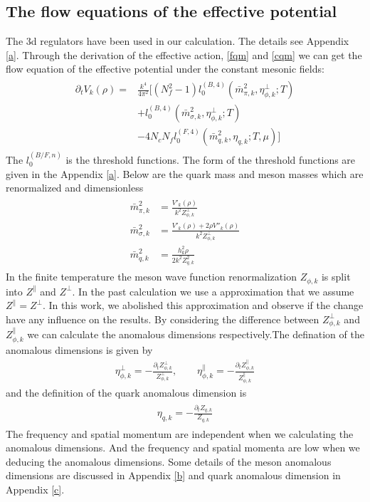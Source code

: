 \documentclass[%
reprint,
superscriptaddress,
showpacs,preprintnumbers,
 amsmath,amssymb,
 aps,
prd,
]{revtex4-1}
\begin{document}
\subsection{The flow equations of the effective potential}
The 3d regulators have been used in our calculation. The details see Appendix \ref{a}. Through the derivation of the 
effective action, \ref{fqm} and \ref{cqm} we can get the flow equation of the effective potential under the constant mesonic
fields:
\begin{align}
\begin{split}
\partial_tV_k(\rho)=&\frac{k^4}{4\pi^2}[(N^2_f-1)l^{(B,4)}_{0}(\bar{m}^{2}_{\pi,k},\eta^{\bot}_{\phi,k};T)\\
&+l^{(B,4)}_{0}(\bar{m}^{2}_{\sigma,k},\eta^{\bot}_{\phi,k};T)\\
&-4N_cN_fl^{(F,4)}_{0}(\bar{m}^{2}_{q,k},\eta_{q,k};T,\mu)]
\end{split}
\end{align}
The $l_0^{(B/F,n)}$ is the threshold functions. The form of the threshold functions are given in the Appendix \ref{a}. Below 
are the quark mass and meson masses which are renormalized and dimensionless
\begin{align}
\begin{split}
\bar{m}^{2}_{\pi,k}&=\frac{V'_k(\rho)}{k^2Z^{\bot}_{\phi,k}}\\
\bar{m}^{2}_{\sigma,k}&=\frac{V'_k(\rho)+2\rho V''_k(\rho)}{k^2Z^{\bot}_{\phi,k}}\\
\bar{m}^{2}_{q,k}&=\frac{h^{2}_{k}\rho}{2k^2Z^{2}_{q,k}}
\end{split}
\end{align}
In the finite temperature the meson wave function renormalization $Z_{\phi,k}$ is split into $Z^\|$ and $Z^\bot$. In the past 
calculation we use a 
approximation that we assume $Z^\|=Z^\bot$. In this work, we abolished this approximation and observe if the change 
have any influence on the results.
By considering the difference between $Z^\bot_{\phi,k}$ and $Z^\|_{\phi,k}$ we can calculate the anomalous dimensions 
respectively.The defination of the 
anomalous dimensions is given by
\begin{align}
\eta_{\phi,k}^\bot=-\frac{\partial_tZ_{\phi,k}^\bot}{Z_{\phi,k}^\bot} ,\qquad \eta_{\phi,k}^\|=-\frac{\partial_tZ_{\phi,k}^\|}
{Z_{\phi,k}^\|}\label{eq:anodim}
\end{align}
and the definition of the quark anomalous dimension is
\begin{align}
\begin{split}
\eta_{q,k}=-\frac{\partial_tZ_{q,k}}{Z_{q,k}}
\end{split}
\end{align}
The frequency and spatial momentum are independent when we calculating the anomalous dimensions. And the 
frequency and spatial momenta are low when we deducing the anomalous dimensions. Some details of the meson 
anomalous dimensions are discussed in Appendix \ref{b} and quark anomalous dimension in Appendix \ref{c}.
\end{document}
